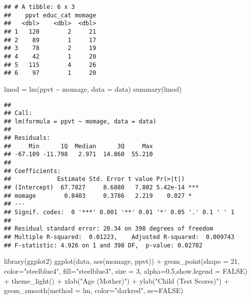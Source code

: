 \documentclass[
]{article}
\newenvironment{Shaded}{\begin{snugshade}}{\end{snugshade}}
\newcommand{\AttributeTok}[1]{\textcolor[rgb]{0.77,0.63,0.00}{#1}}
\newcommand{\ConstantTok}[1]{\textcolor[rgb]{0.00,0.00,0.00}{#1}}
\newcommand{\DecValTok}[1]{\textcolor[rgb]{0.00,0.00,0.81}{#1}}
\newcommand{\FloatTok}[1]{\textcolor[rgb]{0.00,0.00,0.81}{#1}}
\newcommand{\FunctionTok}[1]{\textcolor[rgb]{0.00,0.00,0.00}{#1}}
\newcommand{\NormalTok}[1]{#1}
\newcommand{\OtherTok}[1]{\textcolor[rgb]{0.56,0.35,0.01}{#1}}
\newcommand{\SpecialCharTok}[1]{\textcolor[rgb]{0.00,0.00,0.00}{#1}}
\newcommand{\StringTok}[1]{\textcolor[rgb]{0.31,0.60,0.02}{#1}}
\begin{document}
\begin{verbatim}
## # A tibble: 6 x 3
##    ppvt educ_cat momage
##   <dbl>    <dbl>  <dbl>
## 1   120        2     21
## 2    89        1     17
## 3    78        2     19
## 4    42        1     20
## 5   115        4     26
## 6    97        1     20
\end{verbatim}

\begin{Shaded}
\begin{Highlighting}[]
\NormalTok{lmod }\OtherTok{=} \FunctionTok{lm}\NormalTok{(ppvt }\SpecialCharTok{\textasciitilde{}}\NormalTok{ momage, }\AttributeTok{data =}\NormalTok{ data)}
\FunctionTok{summary}\NormalTok{(lmod)}
\end{Highlighting}
\end{Shaded}

\begin{verbatim}
## 
## Call:
## lm(formula = ppvt ~ momage, data = data)
## 
## Residuals:
##     Min      1Q  Median      3Q     Max 
## -67.109 -11.798   2.971  14.860  55.210 
## 
## Coefficients:
##             Estimate Std. Error t value Pr(>|t|)    
## (Intercept)  67.7827     8.6880   7.802 5.42e-14 ***
## momage        0.8403     0.3786   2.219    0.027 *  
## ---
## Signif. codes:  0 '***' 0.001 '**' 0.01 '*' 0.05 '.' 0.1 ' ' 1
## 
## Residual standard error: 20.34 on 398 degrees of freedom
## Multiple R-squared:  0.01223,    Adjusted R-squared:  0.009743 
## F-statistic: 4.926 on 1 and 398 DF,  p-value: 0.02702
\end{verbatim}

\begin{Shaded}
\begin{Highlighting}[]
\FunctionTok{library}\NormalTok{(ggplot2)}
\FunctionTok{ggplot}\NormalTok{(data, }\FunctionTok{aes}\NormalTok{(momage, ppvt)) }\SpecialCharTok{+}
\FunctionTok{geom\_point}\NormalTok{(}\AttributeTok{shape =} \DecValTok{21}\NormalTok{, }\AttributeTok{color=}\StringTok{"steelblue4"}\NormalTok{, }\AttributeTok{fill=}\StringTok{"steelblue3"}\NormalTok{, }\AttributeTok{size =} \DecValTok{3}\NormalTok{,}
\AttributeTok{alpha=}\FloatTok{0.5}\NormalTok{,}\AttributeTok{show.legend =} \ConstantTok{FALSE}\NormalTok{) }\SpecialCharTok{+}
\FunctionTok{theme\_light}\NormalTok{() }\SpecialCharTok{+} \FunctionTok{xlab}\NormalTok{(}\StringTok{"Age (Mother)"}\NormalTok{) }\SpecialCharTok{+} \FunctionTok{ylab}\NormalTok{(}\StringTok{"Child (Test Scores)"}\NormalTok{) }\SpecialCharTok{+}
\FunctionTok{geom\_smooth}\NormalTok{(}\AttributeTok{method =}\NormalTok{ lm, }\AttributeTok{color=}\StringTok{"darkred"}\NormalTok{, }\AttributeTok{se=}\ConstantTok{FALSE}\NormalTok{)}
\end{Highlighting}
\end{Shaded}
\end{document}
